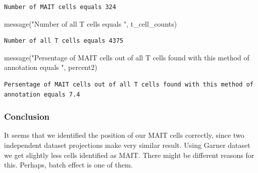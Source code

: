 \documentclass[
  letterpaper,
  DIV=11,
  numbers=noendperiod]{scrartcl}
\newenvironment{Shaded}{\begin{snugshade}}{\end{snugshade}}
\newcommand{\FunctionTok}[1]{\textcolor[rgb]{0.28,0.35,0.67}{#1}}
\newcommand{\NormalTok}[1]{\textcolor[rgb]{0.00,0.23,0.31}{#1}}
\newcommand{\StringTok}[1]{\textcolor[rgb]{0.13,0.47,0.30}{#1}}
\begin{document}
\begin{verbatim}
Number of MAIT cells equals 324
\end{verbatim}

\begin{Shaded}
\begin{Highlighting}[]
\FunctionTok{message}\NormalTok{(}\StringTok{"Number of all T cells equals "}\NormalTok{, t\_cell\_counts)}
\end{Highlighting}
\end{Shaded}

\begin{verbatim}
Number of all T cells equals 4375
\end{verbatim}

\begin{Shaded}
\begin{Highlighting}[]
\FunctionTok{message}\NormalTok{(}\StringTok{"Persentage of MAIT cells out of all T cells found with this method of annotation equals "}\NormalTok{, percent2)}
\end{Highlighting}
\end{Shaded}

\begin{verbatim}
Persentage of MAIT cells out of all T cells found with this method of annotation equals 7.4
\end{verbatim}

\hypertarget{conclusion}{%
\subsubsection{Conclusion}\label{conclusion}}

It seems that we identified the position of our MAIT cells correctly,
since two independent dataset projections make very similar result.
Using Garner dataset we get slightly less cells identified as MAIT.
There might be different reasons for this. Perhaps, batch effect is one
of them.
\end{document}
